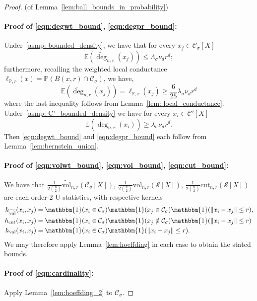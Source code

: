 \documentclass[11pt,twoside]{article}
\newcommand{\vol}{\mathrm{vol}}
\newcommand{\cut}{\mathrm{cut}}
\newcommand{\norm}[1]{\left\lVert#1\right\rVert}
\newcommand{\1}{\mathbbm{1}}
\newcommand{\Xbf}{X}
\newcommand{\Pbb}{\mathbb{P}}
\newcommand{\Sset}{\mathcal{S}}
\newcommand{\Cset}{\mathcal{C}}
\newcommand{\Csig}{\Cset_{\sigma}}
\begin{document}
\begin{proof}{(of Lemma~\ref{lem:ball_bounds_in_probability})}
	\hfill 
	\paragraph{Proof of \eqref{eqn:degwt_bound}, \eqref{eqn:degpr_bound}:}
	Under~\ref{asmp: bounded_density}, we have that for every $x_j \in \Csig[\Xbf]$
	\begin{equation*}
	\mathbb{E}(\widetilde{\deg}_{n,r}(x_j)) \leq \Lambda_{\sigma} \nu_d r^d;
	\end{equation*}
	furthermore, recalling the weighted local conductance $\ell_{\Pbb,r}(x) = \Pbb(B(x,r) \cap \Csig)$, we have,
	\begin{equation*}
	\mathbb{E}(\widetilde{\deg}_{n,r}(x_j)) = \ell_{\Pbb,r}(x_j) \geq \frac{6}{25} \lambda_{\sigma} \nu_d r^d
	\end{equation*}
	where the last inequality follows from Lemma~\ref{lem: local_conductance}.  Under~\ref{asmp: C'_bounded_density} we have for every $x_i \in \Cset'[\Xbf]$
	\begin{equation*}
	\mathbb{E}(\widetilde{\deg}_{n,r}(x_i)) \geq \lambda_{
		\sigma} \nu_d r^d.
	\end{equation*} 
	Then \eqref{eqn:degwt_bound} and \eqref{eqn:degpr_bound} each follow from Lemma~\ref{lem:bernstein_union}.
	
	\paragraph{Proof of \eqref{eqn:volwt_bound}, \eqref{eqn:vol_bound}, \eqref{eqn:cut_bound}:}
	
	We have that $\frac{1}{2{n \choose 2}}\widetilde{\vol}_{n,r}(\Csig[\Xbf])$, $\frac{1}{2{n \choose 2}}\vol_{n,r}(\Sset[\Xbf])$, $\frac{1}{2{n \choose 2}}\cut_{n,r}(\Sset[\Xbf])$ are each order-2 U statistics, with respective kernels
	\begin{align*}
	h_{\widetilde{\vol}}(x_i,x_j) & = \1(x_i \in \Csig)\1(x_j \in \Csig)\1(\norm{x_i - x_j} \leq r), \\ h_{\cut}(x_i,x_j) & = \1(x_i \in \Csig)\1(x_j \notin \Csig)\1(\norm{x_i - x_j} \leq r) \\
	h_{\vol}(x_i,x_j) & = \1(x_i \in \Csig)\1(\norm{x_i - x_j} \leq r).
	\end{align*}
	We may therefore apply Lemma~\ref{lem:hoeffding} in each case to obtain the stated bounds.
	
	\paragraph{Proof of \eqref{eqn:cardinality}:}
	Apply Lemma~\ref{lem:hoeffding_2} to $\Csig$.
\end{proof}
\end{document}
